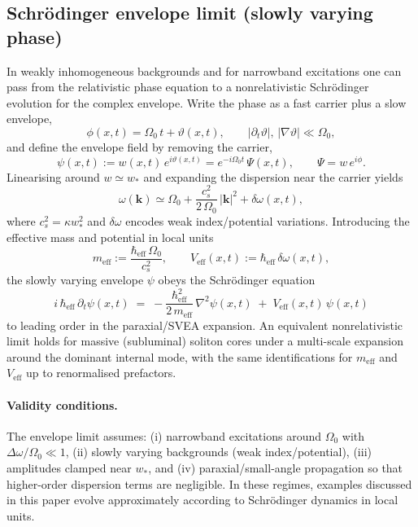 \documentclass[11pt]{article}
\begin{document}
\subsection{Schr\"odinger envelope limit (slowly varying phase)}
In weakly inhomogeneous backgrounds and for narrowband excitations one can pass from the relativistic phase equation to a nonrelativistic Schr\"odinger evolution for the complex envelope. Write the phase as a fast carrier plus a slow envelope,
\begin{equation}
  \phi(x,t) = \Omega_0\,t + \vartheta(x,t),\qquad \big|\partial_t \vartheta\big|,\,\big|\nabla\vartheta\big| \ll \Omega_0,
\end{equation}
and define the envelope field by removing the carrier,
\begin{equation}
  \psi(x,t) := w(x,t)\,e^{i\vartheta(x,t)} = e^{-i\Omega_0 t}\,\Psi(x,t),\qquad \Psi = w\,e^{i\phi}.
\end{equation}
Linearising around $w\simeq w_*$ and expanding the dispersion near the carrier yields
\begin{equation}
  \omega(\mathbf k) \simeq \Omega_0 + \frac{c_s^2}{2\,\Omega_0}\,|\mathbf k|^2 + \delta\omega(x,t),
\end{equation}
where $c_s^2=\kappa w_*^2$ and $\delta\omega$ encodes weak index/potential variations. Introducing the effective mass and potential in local units
\begin{equation}
  m_{\mathrm{eff}} := \frac{\hbar_{\mathrm{eff}}\,\Omega_0}{c_s^2},\qquad V_{\mathrm{eff}}(x,t) := \hbar_{\mathrm{eff}}\,\delta\omega(x,t),
\end{equation}
the slowly varying envelope $\psi$ obeys the Schr\"odinger equation
\begin{equation}
  i\,\hbar_{\mathrm{eff}}\,\partial_t \psi(x,t) \;=\; -\frac{\hbar_{\mathrm{eff}}^2}{2\,m_{\mathrm{eff}}}\,\nabla^2 \psi(x,t) \; +\; V_{\mathrm{eff}}(x,t)\,\psi(x,t)
\end{equation}
to leading order in the paraxial/SVEA expansion. An equivalent nonrelativistic limit holds for massive (subluminal) soliton cores under a multi-scale expansion around the dominant internal mode, with the same identifications for $m_{\mathrm{eff}}$ and $V_{\mathrm{eff}}$ up to renormalised prefactors.

\paragraph{Validity conditions.} The envelope limit assumes: (i) narrowband excitations around $\Omega_0$ with $\Delta\omega/\Omega_0\ll 1$, (ii) slowly varying backgrounds (weak index/potential), (iii) amplitudes clamped near $w_*$, and (iv) paraxial/small-angle propagation so that higher-order dispersion terms are negligible. In these regimes, examples discussed in this paper evolve approximately according to Schr\"odinger dynamics in local units.
\end{document}
